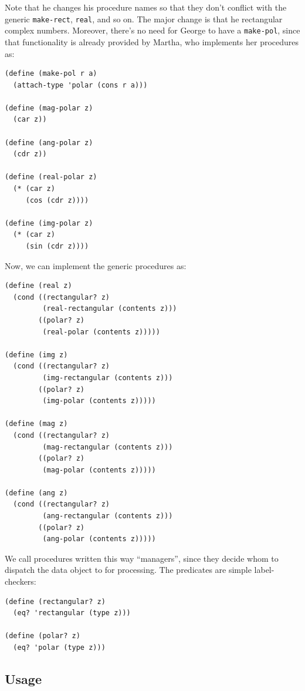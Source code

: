 \documentclass[9pt]{report}
\begin{document}
Note that he changes his procedure names so that they don't
conflict with the generic \texttt{make-rect}, \texttt{real}, and so on. The
major change is that he rectangular complex numbers. Moreover,
there's no need for George to have a \texttt{make-pol}, since that
functionality is already provided by Martha, who implements her
procedures as:

\begin{verbatim}
(define (make-pol r a)
  (attach-type 'polar (cons r a)))

(define (mag-polar z)
  (car z))

(define (ang-polar z)
  (cdr z))

(define (real-polar z)
  (* (car z)
     (cos (cdr z))))

(define (img-polar z)
  (* (car z)
     (sin (cdr z))))
\end{verbatim}

Now, we can implement the generic procedures as:

\begin{verbatim}
(define (real z)
  (cond ((rectangular? z)
         (real-rectangular (contents z)))
        ((polar? z)
         (real-polar (contents z)))))

(define (img z)
  (cond ((rectangular? z)
         (img-rectangular (contents z)))
        ((polar? z)
         (img-polar (contents z)))))

(define (mag z)
  (cond ((rectangular? z)
         (mag-rectangular (contents z)))
        ((polar? z)
         (mag-polar (contents z)))))

(define (ang z)
  (cond ((rectangular? z)
         (ang-rectangular (contents z)))
        ((polar? z)
         (ang-polar (contents z)))))
\end{verbatim}

We call procedures written this way ``managers'', since they decide
whom to dispatch the data object to for processing. The predicates
are simple label-checkers:

\begin{verbatim}
(define (rectangular? z)
  (eq? 'rectangular (type z)))

(define (polar? z)
  (eq? 'polar (type z)))
\end{verbatim}

\subsection{Usage}
\label{sec:org50ec4c4}
\end{document}
